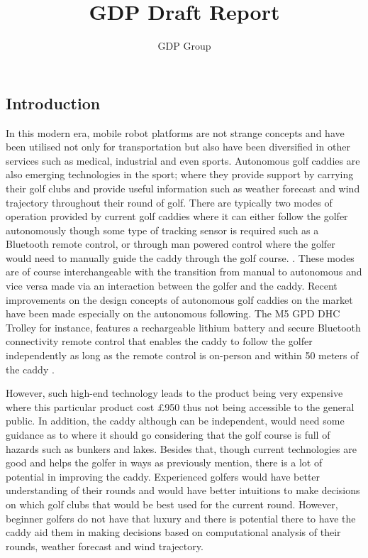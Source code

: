 \documentclass[11pt,landscape]{article}
\title{GDP Draft Report}
\author{GDP Group}
\begin{document}
\maketitle
\newpage
\begin{multicols}{3}
\tableofcontents
\newpage
\section{Introduction}
In this modern era, mobile robot platforms are not strange concepts and have
been utilised not only for transportation but also have been diversified in
other services such as medical, industrial and even sports. Autonomous golf
caddies are also emerging technologies in the sport; where they provide support
by carrying their golf clubs and provide useful information such as weather
forecast and wind trajectory throughout their round of golf. There are typically
two modes of operation provided by current golf caddies where it can either
follow the golfer autonomously though some type of tracking sensor is required
such as a Bluetooth remote control, or through man powered control where the
golfer would need to manually guide the caddy through the golf course.
\cite{choi_2020}. These modes are of course
interchangeable with the transition from manual to autonomous and vice versa
made via an interaction between the golfer and the caddy. Recent improvements on
the design concepts of autonomous golf caddies on the market have been made
especially on the autonomous following. The M5 GPD DHC Trolley for instance,
features a rechargeable lithium battery and secure Bluetooth connectivity remote
control that enables the caddy to follow the golfer independently as long as the
remote control is on-person and within 50 meters of the caddy \cite{golf_2022}.

However, such high-end technology leads to the product being very expensive
where this particular product cost £950 thus not being accessible to the general
public. In addition, the caddy although can be independent, would need some
guidance as to where it should go considering that the golf course is full of
hazards such as bunkers and lakes. Besides that, though current technologies are
good and helps the golfer in ways as previously mention, there is a lot of
potential in improving the caddy. Experienced golfers would have better
understanding of their rounds and would have better intuitions to make decisions
on which golf clubs that would be best used for the current round. However,
beginner golfers do not have that luxury and there is potential there to have
the caddy aid them in making decisions based on computational analysis of their
rounds, weather forecast and wind trajectory. 


\end{multicols}
\end{document}
